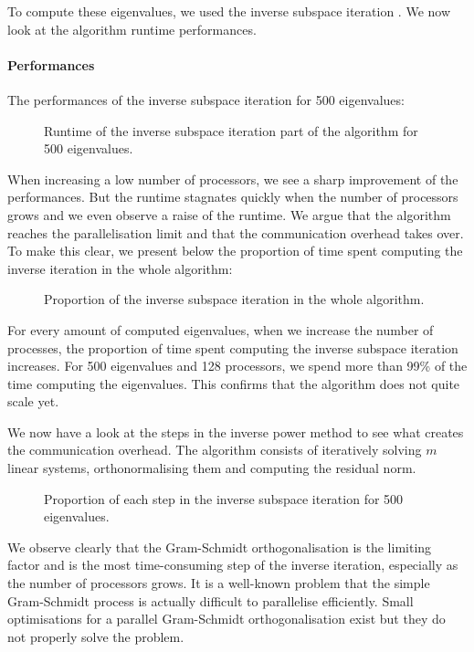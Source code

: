 To compute these eigenvalues, we used the inverse subspace iteration \cite{el_khoury_acceleration_2014}.
We now look at the algorithm runtime performances.

\paragraph{Performances}
The performances of the inverse subspace iteration for 500 eigenvalues:

\begin{figure}[H]
  \centering
  
  \caption{Runtime of the inverse subspace iteration part of the algorithm for 500 eigenvalues.}
\end{figure}

When increasing a low number of processors, we see a sharp improvement of the performances.
But the runtime stagnates quickly when the number of processors grows and we even observe a raise of the runtime.
We argue that the algorithm reaches the parallelisation limit and that the communication overhead takes over.
To make this clear, we present below the proportion of time spent computing the inverse iteration in the whole algorithm:

\begin{figure}[H]
  \centering
  
  \caption{Proportion of the inverse subspace iteration in the whole algorithm.}
\end{figure}

For every amount of computed eigenvalues, when we increase the number of processes, the proportion of time spent computing the inverse subspace iteration increases.
For 500 eigenvalues and 128 processors, we spend more than 99\% of the time computing the eigenvalues.
This confirms that the algorithm does not quite scale yet.

We now have a look at the steps in the inverse power method to see what creates the communication overhead.
The algorithm consists of iteratively solving \(m\) linear systems, orthonormalising them and computing the residual norm.

\begin{figure}[H]
  \centering
  
  \caption{Proportion of each step in the inverse subspace iteration for 500 eigenvalues.}
\end{figure}

We observe clearly that the Gram-Schmidt orthogonalisation is the limiting factor and is the most time-consuming step of the inverse iteration, especially as the number of processors grows.
It is a well-known problem that the simple Gram-Schmidt process is actually difficult to parallelise efficiently.
Small optimisations for a parallel Gram-Schmidt orthogonalisation exist \cite{katagiri_parallel_gram_schmidt_2003} but they do not properly solve the problem.

